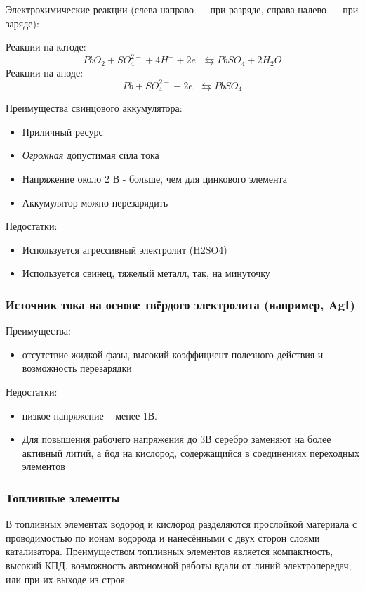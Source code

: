 \documentclass[14pt,a4paper]{scrartcl}
\begin{document}
Электрохимические реакции (слева направо — при разряде, справа налево — при заряде):

Реакции на катоде:
$$PbO_{2}+SO_{4}^{2-}+4H^{+}+2e^{-}\leftrightarrows PbSO_{4}+2H_{2}O$$
Реакции на аноде:
$$Pb+SO_{4}^{2-}-2e^{-}\leftrightarrows PbSO_{4}$$

Преимущества свинцового аккумулятора:
\begin{itemize}
 \item Приличный ресурс
 \item \emph{Огромная} допустимая сила тока
 \item Напряжение около 2 В - больше, чем для цинкового элемента
 \item Аккумулятор можно перезарядить
 \end{itemize}
 
 Недостатки:
 \begin{itemize}
 \item Используется агрессивный электролит (H2SO4)
 \item Используется свинец, тяжелый металл, так, на минуточку
\end{itemize}

\subsubsection*{Источник тока на основе твёрдого электролита (например, AgI)} 

Преимущества:
 \begin{itemize}
 \item отсутствие жидкой фазы, высокий коэффициент полезного действия и возможность перезарядки\end{itemize}
 
 Недостатки:
 \begin{itemize}
 \item низкое напряжение – менее 1В. 
 \item Для повышения рабочего напряжения до 3В серебро заменяют на более активный литий, а йод на кислород, содержащийся в соединениях переходных элементов
 \end{itemize}
 \subsubsection*{Топливные элементы}

В топливных элементах водород и кислород разделяются прослойкой материала с проводимостью по ионам водорода и нанесёнными с двух сторон слоями катализатора. Преимуществом топливных элементов является компактность, высокий КПД, возможность автономной работы вдали от линий электропередач, или при их выходе из строя. 
\end{document}
